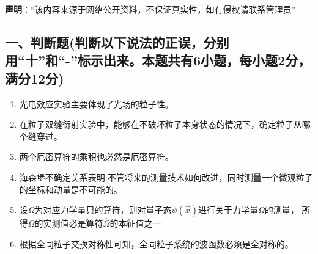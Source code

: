 
\textbf{声明}：“该内容来源于网络公开资料，不保证真实性，如有侵权请联系管理员”

\subsection{一、判断题(判断以下说法的正误，分别用“十”和“-”标示出来。本题共有6小题，每小题2分，满分12分)}
\begin{enumerate}
\item 光电效应实验主要体现了光场的粒子性。
\item 在粒子双缝衍射实验中，能够在不破坏粒子本身状态的情况下，确定粒子从哪个缝穿过。
\item 两个厄密算符的乘积也必然是厄密算符。
\item 海森堡不确定关系表明:不管将来的测量技术如何改进，同时测量一个微观粒子的坐标和动量是不可能的。
\item 设$\Omega$为对应力学量只的算符，则对量子态$\psi(\vec x)$进行关于力学量$\Omega$的测量，
所得$\Omega$的实测值必是算符$\hat\Omega$的本征值之一
\item 根据全同粒子交换对称性可知，全同粒子系统的波函数必须是全对称的。
\end{enumerate}
